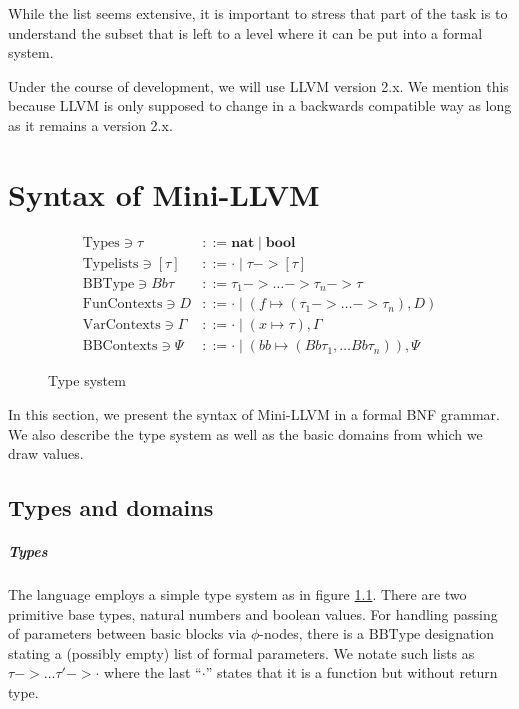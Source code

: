 \documentclass[a4paper, oneside, 10pt, draft]{memoir}
\begin{document}
While the list seems extensive, it is important to stress that part of
the task is to understand the subset that is left to a level where it
can be put into a formal system.

Under the course of development, we will use LLVM version 2.x. We
mention this because LLVM is only supposed to change in a backwards
compatible way as long as it remains a version 2.x.

\chapter{Syntax of Mini-LLVM}

\newcommand{\variables}{\mathrm{Variables}}
\newcommand{\BBlabels}{\mathrm{BB Labels}}
\newcommand{\tnat}{\mathbf{nat}}
\newcommand{\tbool}{\mathbf{bool}}
\newcommand{\types}{\mathrm{Types}}
\newcommand{\typelist}{\mathrm{Type lists}}
\newcommand{\bbtype}{\mathrm{BB Type}}
\newcommand{\ftype}{\mathrm{Fun Contexts}}
\newcommand{\tpenv}{\mathrm{Var Contexts}}
\newcommand{\bbenv}{\mathrm{BB Contexts}}
\newcommand{\bor}{\; \vert \;}

\begin{figure}
  \begin{align*}
    \types \ni \tau & ::= \tnat \bor \tbool \\
    \typelist \ni [\tau] & ::= \cdot \bor \tau -> [\tau] \\
    \bbtype \ni Bb \tau   & ::= \tau_1 -> \dotsc -> \tau_n -> \tau\\
    \ftype \ni D & ::= \cdot \bor (f \mapsto (\tau_1 -> \dotsc ->
    \tau_n), D) \\
    \tpenv \ni \Gamma & ::= \cdot \bor (x \mapsto \tau),\Gamma\\
    \bbenv \ni \Psi   & ::= \cdot \bor (bb \mapsto (Bb \tau_1, \dotsc Bb
    \tau_n)),\Psi
  \end{align*}
  \caption{Type system}
  \label{fig:type-system}
\end{figure}

In this section, we present the syntax of Mini-LLVM in a formal BNF
grammar. We also describe the type system as well as the basic domains
from which we draw values.

\section{Types and domains}

\paragraph{Types} The language employs a simple type system as in
figure \ref{fig:type-system}. There are two primitive base types,
natural numbers and boolean values. For handling passing of parameters
between basic blocks via $\phi$-nodes, there is a $\bbtype$
designation stating a (possibly empty) list of formal parameters. We
notate such lists as $\tau -> \dotsc \tau' -> \cdot$ where the last
``$\cdot$'' states that it is a function but without return type.
\end{document}
